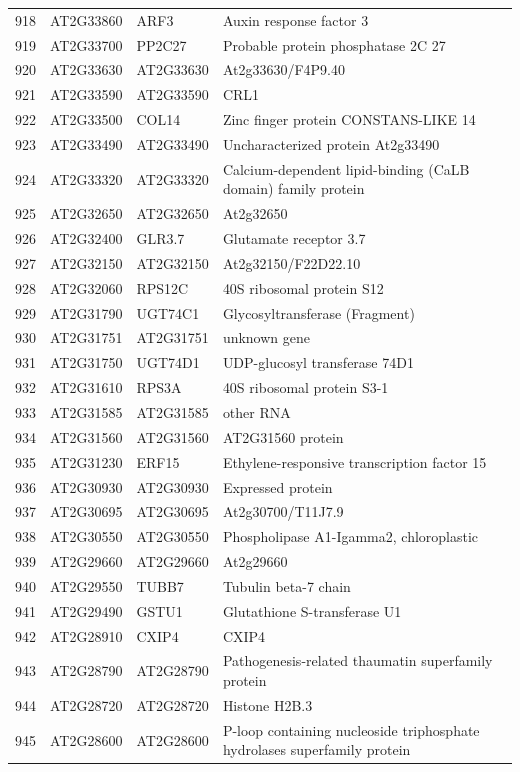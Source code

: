 \documentclass[11pt]{article}
\begin{document}
\begin{center}
\begin{tabular}{rlll}
918 & AT2G33860 & ARF3 & Auxin response factor 3\\
919 & AT2G33700 & PP2C27 & Probable protein phosphatase 2C 27\\
920 & AT2G33630 & AT2G33630 & At2g33630/F4P9.40\\
921 & AT2G33590 & AT2G33590 & CRL1\\
922 & AT2G33500 & COL14 & Zinc finger protein CONSTANS-LIKE 14\\
923 & AT2G33490 & AT2G33490 & Uncharacterized protein At2g33490\\
924 & AT2G33320 & AT2G33320 & Calcium-dependent lipid-binding (CaLB domain) family protein\\
925 & AT2G32650 & AT2G32650 & At2g32650\\
926 & AT2G32400 & GLR3.7 & Glutamate receptor 3.7\\
927 & AT2G32150 & AT2G32150 & At2g32150/F22D22.10\\
928 & AT2G32060 & RPS12C & 40S ribosomal protein S12\\
929 & AT2G31790 & UGT74C1 & Glycosyltransferase (Fragment)\\
930 & AT2G31751 & AT2G31751 & unknown gene\\
931 & AT2G31750 & UGT74D1 & UDP-glucosyl transferase 74D1\\
932 & AT2G31610 & RPS3A & 40S ribosomal protein S3-1\\
933 & AT2G31585 & AT2G31585 & other RNA\\
934 & AT2G31560 & AT2G31560 & AT2G31560 protein\\
935 & AT2G31230 & ERF15 & Ethylene-responsive transcription factor 15\\
936 & AT2G30930 & AT2G30930 & Expressed protein\\
937 & AT2G30695 & AT2G30695 & At2g30700/T11J7.9\\
938 & AT2G30550 & AT2G30550 & Phospholipase A1-Igamma2, chloroplastic\\
939 & AT2G29660 & AT2G29660 & At2g29660\\
940 & AT2G29550 & TUBB7 & Tubulin beta-7 chain\\
941 & AT2G29490 & GSTU1 & Glutathione S-transferase U1\\
942 & AT2G28910 & CXIP4 & CXIP4\\
943 & AT2G28790 & AT2G28790 & Pathogenesis-related thaumatin superfamily protein\\
944 & AT2G28720 & AT2G28720 & Histone H2B.3\\
945 & AT2G28600 & AT2G28600 & P-loop containing nucleoside triphosphate hydrolases superfamily protein\\

\end{tabular}
\end{center}
\end{document}
